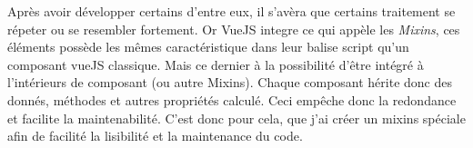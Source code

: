 Après avoir développer certains d'entre eux, il s'avèra que certains traitement se répeter ou se resembler fortement. Or VueJS integre ce qui appèle les \textit{Mixins}, ces éléments possède les mêmes caractéristique dans leur balise script qu'un composant vueJS classique. Mais ce dernier à la possibilité d'être intégré à l'intérieurs de composant (ou autre Mixins). Chaque composant hérite donc des donnés, méthodes et autres propriétés calculé. Ceci empêche donc la redondance et facilite la maintenabilité.
C'est donc pour cela, que j'ai créer un mixins spéciale afin de facilité la lisibilité et la maintenance du code. 